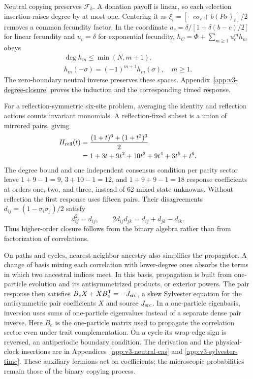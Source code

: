 \documentclass[aps,pre,reprint,amsmath,amssymb,longbibliography]{revtex4-2}
\newcommand{\T}{\mathsf T}
\begin{document}
Neutral copying preserves $\mathscr F_k$. A donation payoff is linear, so each
selection insertion raises degree by at most one. Centering it as
$\xi_i=[-c\sigma_i+b(P\sigma)_i]/2$ removes a common fecundity
factor. In the coordinate $u_c=\delta/[1+\delta(b-c)/2]$ for linear
fecundity and $u_c=\delta$ for exponential fecundity,
$h_C=\Phi+\sum_{m\ge1}u_c^m h_m$ obeys
\begin{equation}
 \begin{gathered}
 \deg h_m\le\min(N,m+1),\\
 h_m(-\sigma)=(-1)^{m+1}h_m(\sigma),\quad m\ge1.
 \end{gathered}
 \label{eq:v4-degree-response}
\end{equation}
The zero-boundary neutral inverse preserves these spaces.
Appendix~\ref{app:v3-degree-closure} proves the induction and the
corresponding timed response.

For a reflection-symmetric six-site problem, averaging the identity and
reflection actions counts invariant monomials. A reflection-fixed subset
is a union of mirrored pairs, giving
\begin{equation}
 \begin{aligned}
 H_{\rm refl}(t)&=\frac{(1+t)^6+(1+t^2)^3}{2}\\
 &=1+3t+9t^2+10t^3
 +9t^4+3t^5+t^6.
 \end{aligned}
 \label{eq:v4-reflected-hilbert}
\end{equation}
The degree bound and one independent consensus condition per parity
sector leave $1+9-1=9$, $3+10-1=12$, and $1+9+9-1=18$ response
coefficients at orders one, two, and three, instead of 62 mixed-state
unknowns. Without reflection the first response uses fifteen pairs.
Their disagreements $d_{ij}=(1-\sigma_i\sigma_j)/2$ satisfy
\begin{equation}
 d_{ij}^2=d_{ij},\qquad
 2d_{ij}d_{jk}=d_{ij}+d_{jk}-d_{ik}.
 \label{eq:v4-pair-relations}
\end{equation}
Thus higher-order closure follows from the binary algebra rather than
from factorization of correlations.

On paths and cycles, nearest-neighbor ancestry also simplifies the
propagator. A change of basis mixing each correlation with lower-degree
ones absorbs the terms in which two ancestral indices meet. In this
basis, propagation is built from one-particle evolution and its
antisymmetrized products, or exterior powers. The pair response
then satisfies $B_eX+XB_e^{\T}=-J_{\rm src}$, a skew Sylvester equation
for the antisymmetric pair coefficients $X$ and source $J_{\rm src}$.
In a one-particle eigenbasis, inversion uses sums of one-particle
eigenvalues instead of a separate dense pair inverse.
Here $B_e$ is the one-particle matrix used to propagate the correlation
sector even under trait complementation. On a cycle its wrap-edge sign is reversed,
an antiperiodic boundary condition. The derivation and the
physical-clock insertions are in Appendices~\ref{app:v3-neutral-cas}
and \ref{app:v3-sylvester-time}. These auxiliary fermions act on
coefficients; the microscopic probabilities remain those of the binary
copying process.
\end{document}
